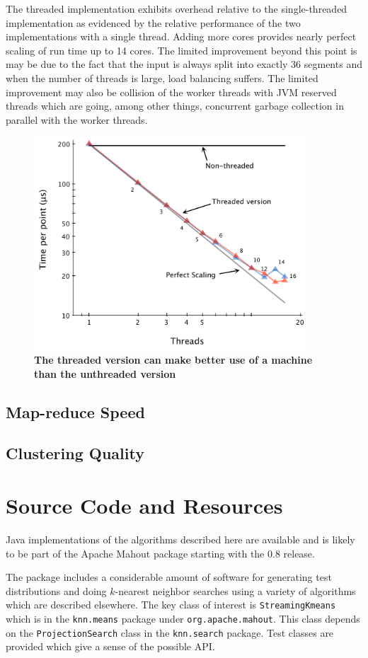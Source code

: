 \documentclass[11pt]{amsart}
\begin{document}
The threaded implementation exhibits  overhead relative to the single-threaded implementation as evidenced by the relative performance of the two implementations with a single thread.  Adding more cores provides nearly perfect scaling of run time up to 14 cores.  The limited improvement beyond this point is may be due to the fact that the input is always split into exactly 36 segments and when the number of threads is large, load balancing suffers.   The limited improvement may also be collision of the worker threads with JVM reserved threads which are going, among other things, concurrent garbage collection in parallel with the worker threads.
\begin{figure}[htbp]
\begin{center}
\includegraphics[width=4in]{thread-timing-16-core-1M.pdf}
\caption{{\bf The threaded version can make better use of a machine than the unthreaded version}}
\label{threaded-timing-16-core}
\end{center}
\end{figure}
\subsection{Map-reduce Speed}
\subsection{Clustering Quality}

\section{Source Code and Resources}
Java implementations of the algorithms described here are available \cite{github/knn} and is likely to be part of the Apache Mahout package starting with the 0.8 release.

The package includes a considerable amount of software for generating test distributions and doing $k$-nearest neighbor searches using a variety of algorithms which are described elsewhere.  The key class of interest is {\tt StreamingKmeans} which is in the {\tt knn.means} package under {\tt org.apache.mahout}.  This class depends on the {\tt ProjectionSearch} class in the {\tt knn.search} package.  Test classes are provided which give a sense of the possible API.
{}

\end{document}
